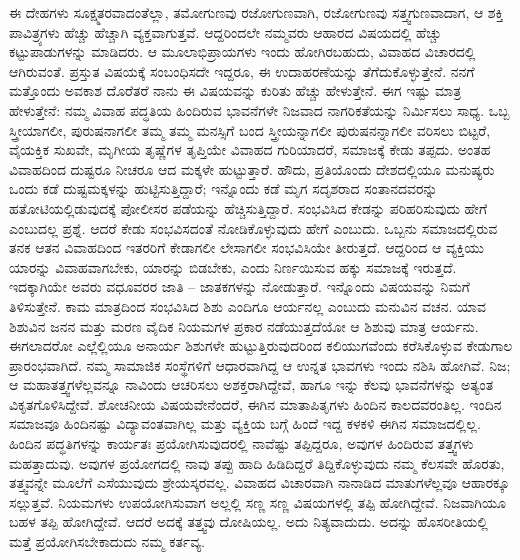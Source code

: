 ಈ ದೇಹಗಳು ಸೂಕ್ಷ್ಮತರವಾದಂತೆಲ್ಲಾ, ತಮೋಗುಣವು ರಜೋಗುಣವಾಗಿ, ರಜೋಗುಣವು ಸತ್ತ್ವಗುಣವಾದಾಗ, ಆ ಶಕ್ತಿ ಪಾವಿತ್ರ್ಯಗಳು ಹೆಚ್ಚು ಹೆಚ್ಚಾಗಿ ವ್ಯಕ್ತವಾಗುತ್ತವೆ. ಆದ್ದರಿಂದಲೇ ನಮ್ಮವರು ಆಹಾರದ ವಿಷಯದಲ್ಲಿ ಹೆಚ್ಚು ಕಟ್ಟುಪಾಡುಗಳನ್ನು ಮಾಡಿದರು. ಆ ಮೂಲಾಭಿಪ್ರಾಯಗಳು ಇಂದು ಹೋಗಿರಬಹುದು, ವಿವಾಹದ ವಿಚಾರದಲ್ಲಿ ಆಗಿರುವಂತೆ. ಪ್ರಸ್ತುತ ವಿಷಯಕ್ಕೆ ಸಂಬಂಧಿಸದೇ ಇದ್ದರೂ, ಈ ಉದಾಹರಣೆಯನ್ನು ತೆಗೆದುಕೊಳ್ಳುತ್ತೇನೆ. ನನಗೆ ಮತ್ತೊಂದು ಅವಕಾಶ ದೊರೆತರೆ ನಾನು ಈ ವಿಷಯವನ್ನು ಕುರಿತು ಹೆಚ್ಚು ಹೇಳುತ್ತೇನೆ. ಈಗ ಇಷ್ಟು ಮಾತ್ರ ಹೇಳುತ್ತೇನೆ: ನಮ್ಮ ವಿವಾಹ ಪದ್ಧತಿಯ ಹಿಂದಿರುವ ಭಾವನೆಗಳೇ ನಿಜವಾದ ನಾಗರಿಕತೆಯನ್ನು ನಿರ್ಮಿಸಲು ಸಾಧ್ಯ. ಒಬ್ಬ ಸ್ತ್ರೀಯಾಗಲೀ, ಪುರುಷನಾಗಲೀ ತಮ್ಮ ತಮ್ಮ ಮನಸ್ಸಿಗೆ ಬಂದ ಸ್ತ್ರೀಯನ್ನಾಗಲೀ ಪುರುಷನನ್ನಾಗಲೀ ವರಿಸಲು ಬಿಟ್ಟರೆ, ವೈಯಕ್ತಿಕ ಸುಖವೇ, ಮೃಗೀಯ ತೃಷ್ಣೆಗಳ ತೃಪ್ತಿಯೇ ವಿವಾಹದ ಗುರಿಯಾದರೆ, ಸಮಾಜಕ್ಕೆ ಕೇಡು ತಪ್ಪದು. ಅಂತಹ ವಿವಾಹದಿಂದ ದುಷ್ಟರೂ ನೀಚರೂ ಆದ ಮಕ್ಕಳೇ ಹುಟ್ಟುತ್ತಾರೆ. ಹೌದು, ಪ್ರತಿಯೊಂದು ದೇಶದಲ್ಲಿಯೂ ಮನುಷ್ಯರು ಒಂದು ಕಡೆ ದುಷ್ಟಮಕ್ಕಳನ್ನು ಹುಟ್ಟಿಸುತ್ತಿದ್ದಾರೆ; ಇನ್ನೊಂದು ಕಡೆ ಮೃಗ ಸದೃಶರಾದ ಸಂತಾನದವರನ್ನು ಹತೋಟಿಯಲ್ಲಿಡುವುದಕ್ಕೆ ಪೋಲೀಸರ ಪಡೆಯನ್ನು ಹೆಚ್ಚಿಸುತ್ತಿದ್ದಾರೆ. ಸಂಭವಿಸಿದ ಕೇಡನ್ನು ಪರಿಹರಿಸುವುದು ಹೇಗೆ ಎಂಬುದಲ್ಲ ಪ್ರಶ್ನೆ. ಆದರೆ ಕೇಡು ಸಂಭವಿಸದಂತೆ ನೋಡಿಕೊಳ್ಳುವುದು ಹೇಗೆ ಎಂಬುದು. ಒಬ್ಬನು ಸಮಾಜದಲ್ಲಿರುವ ತನಕ ಆತನ ವಿವಾಹದಿಂದ ಇತರರಿಗೆ ಕೇಡಾಗಲೀ ಲೇಸಾಗಲೀ ಸಂಭವಿಸಿಯೇ ತೀರುತ್ತದೆ. ಆದ್ದರಿಂದ ಆ ವ್ಯಕ್ತಿಯು ಯಾರನ್ನು ವಿವಾಹವಾಗಬೇಕು, ಯಾರನ್ನು ಬಿಡಬೇಕು, ಎಂದು ನಿರ್ಣಯಿಸುವ ಹಕ್ಕು ಸಮಾಜಕ್ಕೆ ಇರುತ್ತದೆ. ಇದಕ್ಕಾಗಿಯೇ ಅವರು ವಧೂವರರ ಜಾತಿ – ಜಾತಕಗಳನ್ನು ನೋಡುತ್ತಾರೆ. ಇನ್ನೊಂದು ವಿಷಯವನ್ನು ನಿಮಗೆ ತಿಳಿಸುತ್ತೇನೆ. ಕಾಮ ಮಾತ್ರದಿಂದ ಸಂಭವಿಸಿದ ಶಿಶು ಎಂದಿಗೂ ಆರ್ಯನಲ್ಲ ಎಂಬುದು ಮನುವಿನ ವಚನ. ಯಾವ ಶಿಶುವಿನ ಜನನ ಮತ್ತು ಮರಣ ವೈದಿಕ ನಿಯಮಗಳ ಪ್ರಕಾರ ನಡೆಯುತ್ತದೆಯೋ ಆ ಶಿಶುವು ಮಾತ್ರ ಆರ್ಯನು. ಈಗಲಾದರೋ ಎಲ್ಲೆಲ್ಲಿಯೂ ಅನಾರ್ಯ ಶಿಶುಗಳೇ ಹುಟ್ಟುತ್ತಿರುವುದರಿಂದ ಕಲಿಯುಗವೆಂದು ಕರೆಸಿಕೊಳ್ಳುವ ಕೇಡುಗಾಲ ಪ್ರಾರಂಭವಾಗಿದೆ. ನಮ್ಮ ಸಾಮಾಜಿಕ ಸಂಸ್ಥೆಗಳಿಗೆ ಆಧಾರವಾಗಿದ್ದ ಆ ಉನ್ನತ ಭಾವಗಳು ಇಂದು ನಶಿಸಿ ಹೋಗಿವೆ. ನಿಜ; ಆ ಮಹಾತತ್ತ್ವಗಳೆಲ್ಲವನ್ನೂ ನಾವಿಂದು ಆಚರಿಸಲು ಅಶಕ್ತರಾಗಿದ್ದೇವೆ, ಹಾಗೂ ಇನ್ನು ಕೆಲವು ಭಾವನೆಗಳನ್ನು ಅತ್ಯಂತ ವಿಕೃತಗೊಳಿಸಿದ್ದೇವೆ. ಶೋಚನೀಯ ವಿಷಯವೇನೆಂದರೆ, ಈಗಿನ ಮಾತಾಪಿತೃಗಳು ಹಿಂದಿನ ಕಾಲದವರಂತಿಲ್ಲ. ಇಂದಿನ ಸಮಾಜವೂ ಹಿಂದಿನಷ್ಟು ವಿದ್ಯಾವಂತವಾಗಿಲ್ಲ ಮತ್ತು ವ್ಯಕ್ತಿಯ ಬಗ್ಗೆ ಹಿಂದೆ ಇದ್ದ ಕಳಕಳಿ ಈಗಿನ ಸಮಾಜದಲ್ಲಿಲ್ಲ. ಹಿಂದಿನ ಪದ್ಧತಿಗಳನ್ನು ಕಾರ್ಯತಃ ಪ್ರಯೋಗಿಸುವುದರಲ್ಲಿ ನಾವೆಷ್ಟು ತಪ್ಪಿದ್ದರೂ, ಅವುಗಳ ಹಿಂದಿರುವ ತತ್ತ್ವಗಳು ಮಹತ್ತಾದುವು. ಅವುಗಳ ಪ್ರಯೋಗದಲ್ಲಿ ನಾವು ತಪ್ಪು ಹಾದಿ ಹಿಡಿದಿದ್ದರೆ ತಿದ್ದಿಕೊಳ್ಳುವುದು ನಮ್ಮ ಕೆಲಸವೇ ಹೊರತು, ತತ್ತ್ವವನ್ನೇ ಮೂಲೆಗೆ ಎಸೆಯುವುದು ಶ್ರೇಯಸ್ಕರವಲ್ಲ. ವಿವಾಹದ ವಿಚಾರವಾಗಿ ನಾನಾಡಿದ ಮಾತುಗಳೆಲ್ಲವೂ ಆಹಾರಕ್ಕೂ ಸಲ್ಲುತ್ತವೆ. ನಿಯಮಗಳು ಉಪಯೋಗಿಸುವಾಗ ಅಲ್ಲಲ್ಲಿ ಸಣ್ಣ ಸಣ್ಣ ವಿಷಯಗಳಲ್ಲಿ ತಪ್ಪಿ ಹೋಗಿದ್ದೇವೆ. ನಿಜವಾಗಿಯೂ ಬಹಳ ತಪ್ಪಿ ಹೋಗಿದ್ದೇವೆ. ಆದರೆ ಅದಕ್ಕೆ ತತ್ತ್ವವು ದೋಷಿಯಲ್ಲ. ಅದು ನಿತ್ಯವಾದುದು. ಅದನ್ನು ಹೊಸರೀತಿಯಲ್ಲಿ ಮತ್ತೆ ಪ್ರಯೋಗಿಸಬೇಕಾದುದು ನಮ್ಮ ಕರ್ತವ್ಯ.

